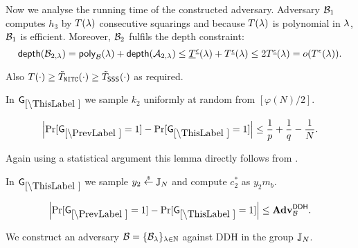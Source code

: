 Now we analyse the running time of the constructed adversary. Adversary $\mathcal{B}_1$ computes $h_3$ by $T(\lambda)$ consecutive squarings and because $T(\lambda)$ is polynomial in $\lambda$, $\mathcal{B}_1$ is efficient. Moreover, $\mathcal{B}_2$ fulfils the depth constraint:
\[ \mathsf{depth}(\mathcal{B}_{2,\lambda}) = \mathsf{poly}_{\mathcal{B}}(\lambda) + \mathsf{depth}(\mathcal{A}_{2,\lambda}) \leq \underline{T}^{\underline{\epsilon}}(\lambda) + T^{\underline{\epsilon}}(\lambda) \leq 2 T^{\underline{\epsilon}}(\lambda) = o(T^{\epsilon}(\lambda)). \] 

Also $T(\cdot) \geq \tilde{T}_{\mathtt{NITC}}(\cdot) \geq \tilde{T}_\mathsf{SSS}(\cdot)$ as required.  

%


In $\games_\thisgame$ we sample $k_2$ uniformly at random from $[\varphi(N)/2]$. 

\begin{lemma}
\[
\left|\Pr[\games_\prevgame = 1] - \Pr[\games_\thisgame = 1]\right| \leq \frac{1}{p}+\frac{1}{q}-\frac{1}{N}.
\]
\end{lemma}

Again using a statistical argument this lemma directly follows from .

In $\games_\thisgame$ we sample $y_2 \stackrel{{\scriptscriptstyle\$}}{\leftarrow} \mathbb{J}_N$ and compute $c_2^*$ as  $y_2 m_b$. 

\begin{lemma}\label{lem-mh:ddh}
\[
\left|\Pr[\games_\prevgame = 1] - \Pr[\games_\thisgame = 1]\right| \leq \advtg_\advB^\ddh.
\]
\end{lemma}
We construct an adversary $\mathcal{B} = \{\mathcal{B}_{\lambda}\}_{\lambda \in \mathbb{N}}$ against DDH in the group $\mathbb{J}_N$. %

